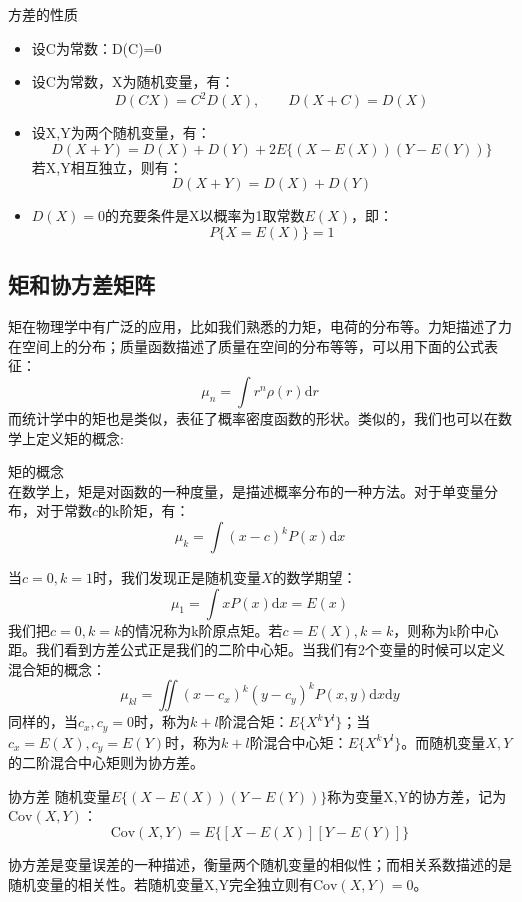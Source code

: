 \begin{prop}{方差的性质}
    \begin{itemize}
        \item 设C为常数：D(C)=0
        \item 设C为常数，X为随机变量，有：$$D(CX)=C^2D(X),\qquad D(X+C)=D(X)$$
        \item 设X,Y为两个随机变量，有：$$D(X+Y)=D(X)+D(Y)+2E\{ (X-E(X))(Y-E(Y)) \}$$ 若X,Y相互独立，则有：$$ D(X+Y)=D(X)+D(Y) $$
        \item $D(X)=0$的充要条件是X以概率为1取常数$E(X)$，即：$$ P\{ X=E(X) \}=1 $$
    \end{itemize}
\end{prop}

\subsection{矩和协方差矩阵}
矩在物理学中有广泛的应用，比如我们熟悉的力矩，电荷的分布等。力矩描述了力在空间上的分布；质量函数描述了质量在空间的分布等等，可以用下面的公式表征：
$$
\mu_n = \int r^n \rho(r)\mathrm{d} r
$$
而统计学中的矩也是类似，表征了概率密度函数的形状。类似的，我们也可以在数学上定义矩的概念:
\begin{definition}{矩的概念\\}
    在数学上，矩是对函数的一种度量，是描述概率分布的一种方法。对于单变量分布，对于常数$c$的k阶矩，有：
    \begin{equation}
        \mu_k=\int (x-c)^k P(x)\mathrm{d}x
    \end{equation}
\end{definition}
当$c=0,k=1$时，我们发现正是随机变量$X$的数学期望：
$$ \mu_1=\int xP(x)\mathrm{d}x = E(x) $$我们把$c=0,k=k$的情况称为k阶原点矩。若$c=E(X),k=k$，则称为k阶中心距。我们看到方差公式正是我们的二阶中心矩。当我们有2个变量的时候可以定义混合矩的概念：
$$\mu_{kl}=\iint (x-c_x)^k (y-c_y)^k P(x,y)\mathrm{d}x\mathrm{d}y$$
同样的，当$c_x,c_y=0$时，称为$k+l$阶混合矩：$E\{X^kY^l\}$；当$c_x=E(X),c_y=E(Y)$时，称为$k+l$阶混合中心矩：$E\{X^kY^l\}$。而随机变量$X,Y$的二阶混合中心矩则为协方差。
\begin{definition}{协方差}
    随机变量$E\{ (X-E(X))(Y-E(Y)) \}$称为变量X,Y的协方差，记为$\mathrm{Cov}(X,Y)$：
    \begin{equation}
        \mathrm{Cov}(X,Y)=E\{[X-E(X)][Y-E(Y)]\}
    \end{equation}
\end{definition}

协方差是变量误差的一种描述，衡量两个随机变量的相似性；而相关系数描述的是随机变量的相关性。若随机变量X,Y完全独立则有$\mathrm{Cov}(X,Y)=0$。

